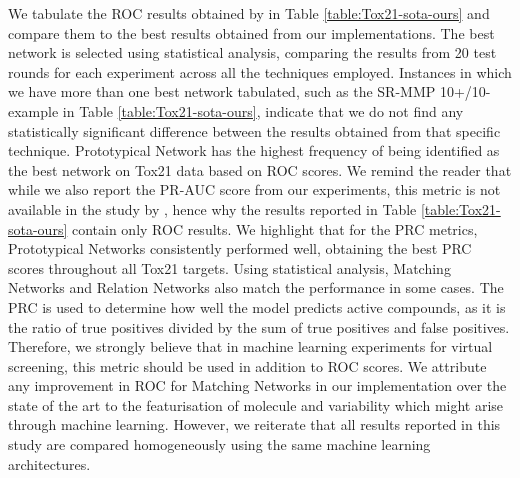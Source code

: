 We tabulate the ROC results obtained by \citet{altae2017low} in Table \ref{table:Tox21-sota-ours} and compare them to the best results obtained from our implementations. The best network is selected using statistical analysis, comparing the results from 20 test rounds for each experiment across all the techniques employed. Instances in which we have more than one best network tabulated, such as the SR-MMP 10+/10- example in Table \ref{table:Tox21-sota-ours}, indicate that we do not find any statistically significant difference between the results obtained from that specific technique. Prototypical Network has the highest frequency of being identified as the best network on Tox21 data based on ROC scores. We remind the reader that while we also report the PR-AUC score from our experiments, this metric is not available in the study by \citet{altae2017low}, hence why the results reported in Table \ref{table:Tox21-sota-ours} contain only ROC results. We highlight that for the PRC metrics, Prototypical Networks consistently performed well, obtaining the best PRC scores throughout all Tox21 targets. Using statistical analysis, Matching Networks and Relation Networks also match the performance in some cases. The PRC is used to determine how well the model predicts active compounds, as it is the ratio of true positives divided by the sum of true positives and false positives. Therefore, we strongly believe that in machine learning experiments for virtual screening, this metric should be used in addition to ROC scores. We attribute any improvement in ROC for Matching Networks in our implementation over the state of the art to the featurisation of molecule and variability which might arise through machine learning. However, we reiterate that all results reported in this study are compared homogeneously using the same machine learning architectures. 

